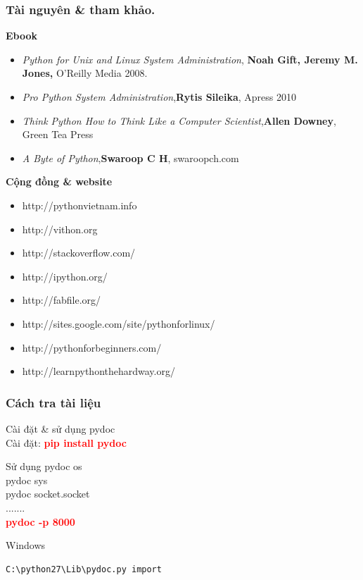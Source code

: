 \documentclass[10pt]{beamer}
\newcommand\sFontvi{\fontsize{8}{7.2}\selectfont} %
\begin{document}
\label{Tham khao}
\begin{frame}[fragile]
\frametitle{Tài nguyên \& tham khảo.}
\framebreak
\pause
\sFontvi
\textbf{Ebook} \label{Ebook tham khao}
\framebreak
\pause
\begin{itemize}
\item \textit{Python for Unix and Linux System Administration},\textbf{ Noah Gift, Jeremy M. Jones,} O'Reilly Media 2008.
\item \textit{Pro Python System Administration},\textbf{Rytis Sileika}, Apress 2010
\item \textit{Think Python How to Think Like a Computer Scientist},\textbf{Allen Downey}, Green Tea Press
\item \textit{A Byte of Python},\textbf{Swaroop C H}, swaroopch.com
\end{itemize}
%
\framebreak
\pause
\textbf{Cộng đồng \& website}
\framebreak
\pause
\begin{itemize}
	\item http://pythonvietnam.info
	\item http://vithon.org
	\item http://stackoverflow.com/
	\item http://ipython.org/
	\item http://fabfile.org/
	\item http://sites.google.com/site/pythonforlinux/	
	\item http://pythonforbeginners.com/
	\item http://learnpythonthehardway.org/
\end{itemize}
\end{frame}
\label{Bonus}
\label{Slide: Cach tra tai lieu}
\begin{frame}[fragile]
\frametitle{Cách tra tài liệu}
Cài đặt \& sử dụng pydoc \\ \pause
Cài đặt: \textcolor{red}{\textbf{pip install pydoc}}\\
\begin{block}{Sử dụng}
pydoc os \\
pydoc sys \\
pydoc socket.socket\\ 
.......\\
\pause
\textcolor{red}{\textbf{pydoc -p 8000}}
\end{block} 
\pause
\begin{block}{Windows} 
\begin{verbatim}
C:\python27\Lib\pydoc.py import
\end{verbatim} 
\end{block}
\end{frame}
\end{document}
